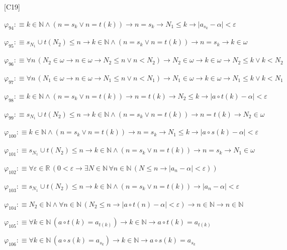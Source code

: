 \begin{fullproof}{[C19]}
\begin{abbrevlist}
\item $\varphi_{94} :\equiv k \in \mathbb{N} \land (n = s_{k} \lor n = t(k)) \to n = s_{k} \to N_{1} \leq k \to \lvert a_{s_{k}} - \alpha \rvert < \varepsilon$
\item $\varphi_{95} :\equiv s_{N_{1}} \cup t(N_{2}) \leq n \to k \in \mathbb{N} \land (n = s_{k} \lor n = t(k)) \to n = s_{k} \to k \in \omega$
\item $\varphi_{96} :\equiv \forall n\,(N_{2} \in \omega \to n \in \omega \to N_{2} \leq n \lor n < N_{2}) \to N_{2} \in \omega \to k \in \omega \to N_{2} \leq k \lor k < N_{2}$
\item $\varphi_{97} :\equiv \forall n\,(N_{1} \in \omega \to n \in \omega \to N_{1} \leq n \lor n < N_{1}) \to N_{1} \in \omega \to k \in \omega \to N_{1} \leq k \lor k < N_{1}$
\item $\varphi_{98} :\equiv k \in \mathbb{N} \land (n = s_{k} \lor n = t(k)) \to n = t(k) \to N_{2} \leq k \to \lvert a \circ t(k) - \alpha \rvert < \varepsilon$
\item $\varphi_{99} :\equiv s_{N_{1}} \cup t(N_{2}) \leq n \to k \in \mathbb{N} \land (n = s_{k} \lor n = t(k)) \to n = t(k) \to N_{2} \in \omega$
\item $\varphi_{100} :\equiv k \in \mathbb{N} \land (n = s_{k} \lor n = t(k)) \to n = s_{k} \to N_{1} \leq k \to \lvert a \circ s(k) - \alpha \rvert < \varepsilon$
\item $\varphi_{101} :\equiv s_{N_{1}} \cup t(N_{2}) \leq n \to k \in \mathbb{N} \land (n = s_{k} \lor n = t(k)) \to n = s_{k} \to N_{1} \in \omega$
\item $\varphi_{102} :\equiv \forall \varepsilon \in \mathbb{R}\,(0 < \varepsilon \to \exists N \in \mathbb{N}\,\forall n \in \mathbb{N}\,(N \leq n \to \lvert a_{n} - \alpha \rvert < \varepsilon))$
\item $\varphi_{103} :\equiv s_{N_{1}} \cup t(N_{2}) \leq n \to k \in \mathbb{N} \land (n = s_{k} \lor n = t(k)) \to \lvert a_{n} - \alpha \rvert < \varepsilon$
\item $\varphi_{104} :\equiv N_{2} \in \mathbb{N} \land \forall n \in \mathbb{N}\,(N_{2} \leq n \to \lvert a \circ t(n) - \alpha \rvert < \varepsilon) \to n \in \mathbb{N} \to n \in \mathbb{N}$
\item $\varphi_{105} :\equiv \forall k \in \mathbb{N}\,(a \circ t(k) = a_{t(k)}) \to k \in \mathbb{N} \to a \circ t(k) = a_{t(k)}$
\item $\varphi_{106} :\equiv \forall k \in \mathbb{N}\,(a \circ s(k) = a_{s_{k}}) \to k \in \mathbb{N} \to a \circ s(k) = a_{s_{k}}$

\end{abbrevlist}
\end{fullproof}
